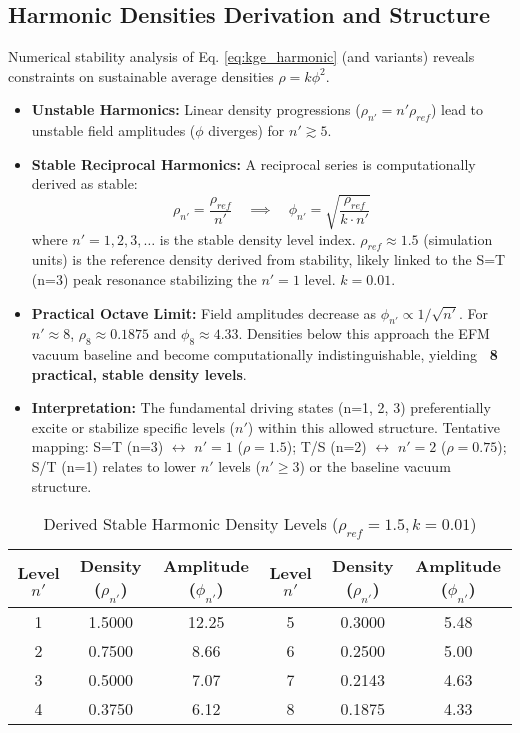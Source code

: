 \documentclass[11pt]{article}
\begin{document}
\subsection{Harmonic Densities Derivation and Structure} %
Numerical stability analysis of Eq. \ref{eq:kge_harmonic} (and variants) reveals constraints on sustainable average densities \(\rho = k \phi^2\).
\begin{itemize}
    \item \textbf{Unstable Harmonics:} Linear density progressions (\(\rho_{n'} = n' \rho_{ref}\)) lead to unstable field amplitudes (\(\phi\) diverges) for \(n' \gtrsim 5\).
    \item \textbf{Stable Reciprocal Harmonics:} A reciprocal series is computationally derived as stable:
        \begin{equation}
        \rho_{n'} = \frac{\rho_{ref}}{n'} \quad \implies \quad \phi_{n'} = \sqrt{\frac{\rho_{ref}}{k \cdot n'}}
        \end{equation}
        where \(n'=1, 2, 3, \dots\) is the stable density level index. \(\rho_{ref} \approx 1.5\) (simulation units) is the reference density derived from stability, likely linked to the S=T (n=3) peak resonance stabilizing the \(n'=1\) level. \(k=0.01\).
    \item \textbf{Practical Octave Limit:} Field amplitudes decrease as \(\phi_{n'} \propto 1/\sqrt{n'}\). For \(n' \approx 8\), \(\rho_{8} \approx 0.1875\) and \(\phi_8 \approx 4.33\). Densities below this approach the EFM vacuum baseline and become computationally indistinguishable, yielding \textbf{~8 practical, stable density levels}.
    \item \textbf{Interpretation:} The fundamental driving states (n=1, 2, 3) preferentially excite or stabilize specific levels (\(n'\)) within this allowed structure. Tentative mapping: S=T (n=3) \(\leftrightarrow\) \(n'=1\) (\(\rho=1.5\)); T/S (n=2) \(\leftrightarrow\) \(n'=2\) (\(\rho=0.75\)); S/T (n=1) relates to lower \(n'\) levels (\(n' \ge 3\)) or the baseline vacuum structure.
\end{itemize}

\begin{table}[htbp]
    \centering
    \caption{Derived Stable Harmonic Density Levels (\(\rho_{ref}=1.5, k=0.01\))}
    \label{tab:density_levels}
    \begin{tabular}{@{}ccc|ccc@{}}
        \toprule
        Level \(n'\) & Density (\(\rho_{n'}\)) & Amplitude (\(\phi_{n'}\)) & Level \(n'\) & Density (\(\rho_{n'}\)) & Amplitude (\(\phi_{n'}\)) \\
        \midrule
        1 & 1.5000 & 12.25 & 5 & 0.3000 & 5.48 \\
        2 & 0.7500 & 8.66 & 6 & 0.2500 & 5.00 \\
        3 & 0.5000 & 7.07 & 7 & 0.2143 & 4.63 \\
        4 & 0.3750 & 6.12 & 8 & 0.1875 & 4.33 \\
        \bottomrule
    \end{tabular}
\end{table}
\end{document}
